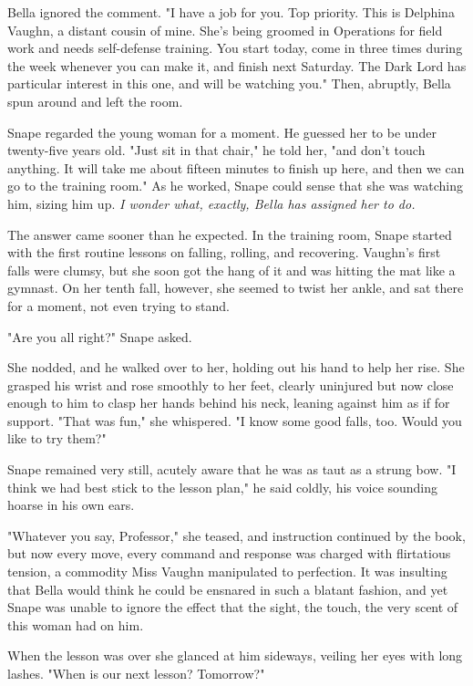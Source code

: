 Bella ignored the comment. "I have a job for you. Top priority. This is Delphina Vaughn, a distant cousin of mine. She's being groomed in Operations for field work and needs self-defense training. You start today, come in three times during the week whenever you can make it, and finish next Saturday. The Dark Lord has particular interest in this one, and will be watching you." Then, abruptly, Bella spun around and left the room.

Snape regarded the young woman for a moment. He guessed her to be under twenty-five years old. "Just sit in that chair," he told her, "and don't touch anything. It will take me about fifteen minutes to finish up here, and then we can go to the training room." As he worked, Snape could sense that she was watching him, sizing him up. \emph{I wonder what, exactly, Bella has assigned her to do.}

The answer came sooner than he expected. In the training room, Snape started with the first routine lessons on falling, rolling, and recovering. Vaughn's first falls were clumsy, but she soon got the hang of it and was hitting the mat like a gymnast. On her tenth fall, however, she seemed to twist her ankle, and sat there for a moment, not even trying to stand.

"Are you all right?" Snape asked.

She nodded, and he walked over to her, holding out his hand to help her rise. She grasped his wrist and rose smoothly to her feet, clearly uninjured but now close enough to him to clasp her hands behind his neck, leaning against him as if for support. "That was fun," she whispered. "I know some good falls, too. Would you like to try them?"

Snape remained very still, acutely aware that he was as taut as a strung bow. "I think we had best stick to the lesson plan," he said coldly, his voice sounding hoarse in his own ears.

"Whatever you say, Professor," she teased, and instruction continued by the book, but now every move, every command and response was charged with flirtatious tension, a commodity Miss Vaughn manipulated to perfection. It was insulting that Bella would think he could be ensnared in such a blatant fashion, and yet Snape was unable to ignore the effect that the sight, the touch, the very scent of this woman had on him.

When the lesson was over she glanced at him sideways, veiling her eyes with long lashes. "When is our next lesson? Tomorrow?"

